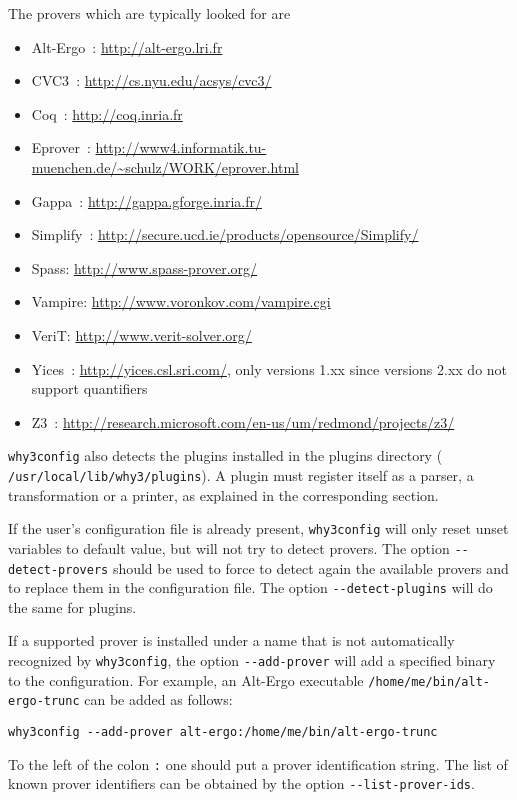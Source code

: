 The provers which are typically looked for are
\begin{itemize}
\item Alt-Ergo~\cite{conchon08smt,ergo}: \url{http://alt-ergo.lri.fr}
\item CVC3~\cite{BarTin-CAV-07}: \url{http://cs.nyu.edu/acsys/cvc3/}
\item Coq~\cite{CoqArt}: \url{http://coq.inria.fr}
\item Eprover~\cite{schulz04ijcar}: \url{http://www4.informatik.tu-muenchen.de/~schulz/WORK/eprover.html}
\item Gappa~\cite{melquiond08rnc}: \url{http://gappa.gforge.inria.fr/}
\item Simplify~\cite{simplify05}: \url{http://secure.ucd.ie/products/opensource/Simplify/}
\item Spass: \url{http://www.spass-prover.org/}
\item Vampire: \url{http://www.voronkov.com/vampire.cgi}
\item VeriT: \url{http://www.verit-solver.org/}
\item Yices~\cite{DM06}: \url{http://yices.csl.sri.com/}, only versions 1.xx since versions 2.xx do not support quantifiers
\item Z3~\cite{z3}: \url{http://research.microsoft.com/en-us/um/redmond/projects/z3/}
\end{itemize}

\texttt{why3config} also detects the plugins installed in the \why
plugins directory (\eg{} \texttt{/usr/local/lib/why3/plugins}). A
plugin must register itself as a parser, a transformation or a
printer, as explained in the corresponding section.

If the user's configuration file is already present,
\texttt{why3config} will only reset unset variables to default value,
but will not try to detect provers.
The option \verb|--detect-provers| should be used to force
\why to detect again the available
provers and to replace them in the configuration file. The option
\verb|--detect-plugins| will do the same for plugins.

If a supported prover is installed under a name
that is not automatically recognized by \texttt{why3config},
the option \verb|--add-prover| will add a specified binary
to the configuration. For example, an Alt-Ergo executable
\verb|/home/me/bin/alt-ergo-trunc| can be added as follows:
\begin{verbatim}
why3config --add-prover alt-ergo:/home/me/bin/alt-ergo-trunc
\end{verbatim}
To the left of the colon \verb|:| one should put a prover
identification string. The list of known prover identifiers
can be obtained by the option \verb|--list-prover-ids|.

